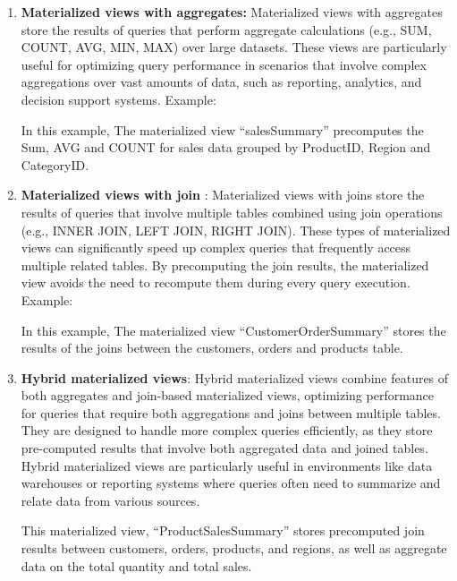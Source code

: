 \begin{enumerate}[label=\alph*)]
    \item \textbf{Materialized views with aggregates:} Materialized views with aggregates store the results of queries that perform aggregate calculations (e.g., SUM, COUNT, AVG, MIN, MAX) over large datasets. These views are particularly useful for optimizing query performance in scenarios that involve complex aggregations over vast amounts of data, such as reporting, analytics, and decision support systems. Example:\vspace{.4cm}
    
    

    In this example, The materialized view ``salesSummary'' precomputes the Sum, AVG and COUNT for sales data grouped by ProductID, Region and CategoryID.

    \item \textbf{Materialized views with join }: Materialized views with joins store the results of queries that involve multiple tables combined using join operations (e.g., INNER JOIN, LEFT JOIN, RIGHT JOIN). These types of materialized views can significantly speed up complex queries that frequently access multiple related tables. By precomputing the join results, the materialized view avoids the need to recompute them during every query execution. Example: \vspace{.4cm}
    
    

    In this example, The materialized view ``CustomerOrderSummary''
    stores the results of the joins between the customers, orders and products table.
    
    \item \textbf{Hybrid materialized views}: Hybrid materialized views combine features of both aggregates and join-based materialized views, optimizing performance for queries that require both aggregations and joins between multiple tables. They are designed to handle more complex queries efficiently, as they store pre-computed results that involve both aggregated data and joined tables. Hybrid materialized views are particularly useful in environments like data warehouses or reporting systems where queries often need to summarize and relate data from various sources. \vspace{.4cm}
    
     
    
This materialized view, ``ProductSalesSummary'' stores precomputed join results between customers, orders, products, and regions, as well as aggregate data on the total quantity and total sales.
    
\end{enumerate}

